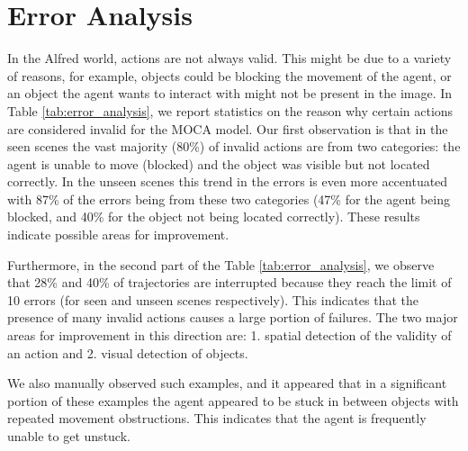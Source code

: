\documentclass[11pt,a4paper]{article}
\begin{document}
\section{Error Analysis}
In the Alfred world, actions are not always valid. This might be due to a variety of reasons, for example, objects could be blocking the movement of the agent, or an object the agent wants to interact with might not be present in the image.   
In Table \ref{tab:error_analysis}, we report statistics on the reason why certain actions are considered invalid for the MOCA model. Our first observation is that in the seen scenes  the vast majority (80\%) of invalid actions are from two categories: the agent is unable to move (blocked) and the object was visible but not located correctly. In the unseen scenes this trend in the errors is even more accentuated with   87\% of the errors being from these two categories  (47\% for the agent being blocked, and 40\% for the object not being located correctly). These results indicate possible areas for improvement.

Furthermore, in the second part of the Table \ref{tab:error_analysis}, we observe that 28\% and 40\% of trajectories are interrupted because they reach the limit of 10 errors (for seen and unseen scenes respectively). This indicates that the presence of many invalid actions causes a large portion of failures. The two major areas for improvement in this direction are: 1. spatial detection of the validity of an action and 2. visual detection of objects.

We also manually observed such examples, and it appeared that in a significant portion of these examples the agent appeared to be stuck in between objects with repeated movement obstructions. This indicates that the agent is frequently unable to get unstuck. 
\end{document}
